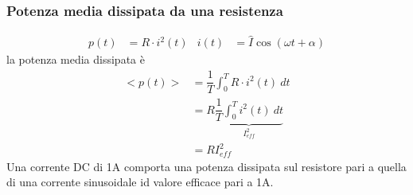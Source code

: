 \documentclass{article}
\begin{document}
\subsubsection{Potenza media dissipata da una resistenza}
\begin{align*}
    p(t) &= R\cdot i^2(t) & i(t) &= \hat I \cos (\omega t + \alpha)
\end{align*}
la potenza media dissipata è
\begin{align*}
    <p(t)> &= \dfrac{1}{T} \int_0^T R \cdot i^2(t) \ dt\\
    &=R\underbrace{\dfrac{1}{T} \int_0^T i^2(t) \ dt}_{I_{eff}^2}\\
    &=RI_{eff}^2
\end{align*}
Una corrente DC di 1A comporta una potenza dissipata sul resistore pari a quella di una corrente sinusoidale id valore efficace pari a 1A.
\end{document}
